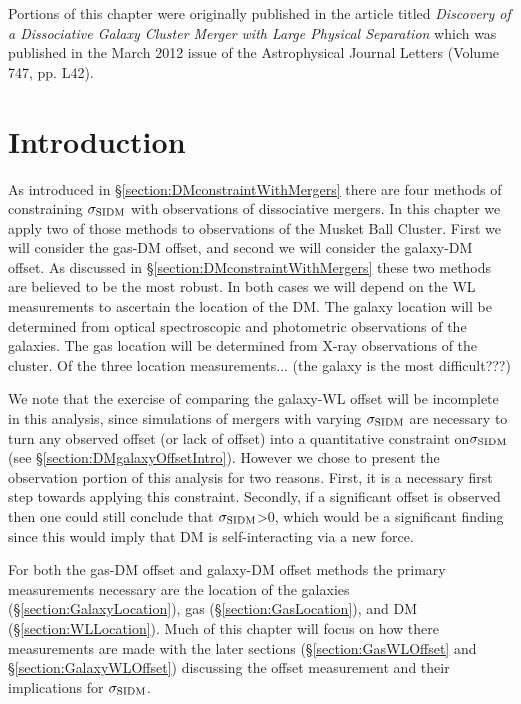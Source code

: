 \label{chapter:4}

\noindent Portions of this chapter were originally published in the article titled \emph{Discovery of a Dissociative Galaxy Cluster Merger with Large Physical Separation} which was published in the March 2012 issue of the Astrophysical Journal Letters (Volume 747, pp. L42). \\

\section{Introduction}

As introduced in \S\ref{section:DMconstraintWithMergers} there are four methods of constraining $\sigma_{\rm SIDM}$ with observations of dissociative mergers.
In this chapter we apply two of those methods to observations of the Musket Ball Cluster.
First we will consider the gas-DM offset, and second we will consider the galaxy-DM offset.
As discussed in \S\ref{section:DMconstraintWithMergers} these two methods are believed to be the most robust.
In both cases we will depend on the WL measurements to ascertain the location of the DM.
The galaxy location will be determined from optical spectroscopic and photometric observations of the galaxies.
The gas location will be determined from X-ray observations of the cluster.
Of the three location measurements... (the galaxy is the most difficult???)

We note that the exercise of comparing the galaxy-WL offset will be incomplete in this analysis, since simulations of mergers with varying $\sigma_{\rm SIDM}$ are necessary to turn any observed offset (or lack of offset) into a quantitative constraint on$\sigma_{\rm SIDM}$ (see \S\ref{section:DMgalaxyOffsetIntro}). 
However we chose to present the observation portion of this analysis for two reasons.
First, it is a necessary first step towards applying this constraint.
Secondly, if a significant offset is observed then one could still conclude that $\sigma_{\rm SIDM}$>0, which would be a significant finding since this would imply that DM is self-interacting via a new force.

For both the gas-DM offset and galaxy-DM offset methods the primary measurements necessary are the location of the galaxies (\S\ref{section:GalaxyLocation}), gas (\S\ref{section:GasLocation}), and DM (\S\ref{section:WLLocation}).
Much of this chapter will focus on how there measurements are made with the later sections (\S\ref{section:GasWLOffset} and \S\ref{section:GalaxyWLOffset}) discussing the offset measurement and their implications for $\sigma_{\rm SIDM}$.

